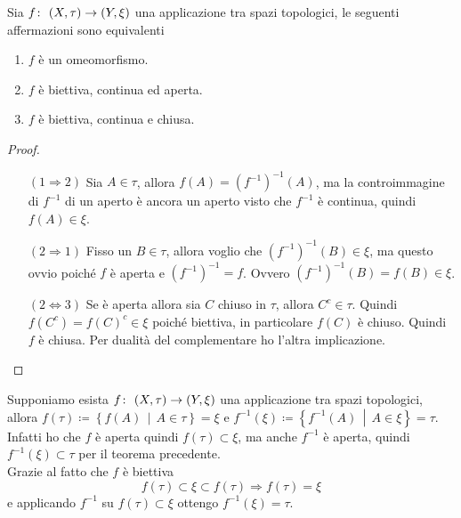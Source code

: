 \begin{theorem}
	Sia $f \colon\ (X,\tau) \rightarrow (Y,\xi)$ una applicazione tra spazi topologici, le seguenti affermazioni sono equivalenti
	\begin{enumerate}
		\item $f$ è un omeomorfismo.
		\item $f$ è biettiva, continua ed aperta.
		\item $f$ è biettiva, continua e chiusa.
	\end{enumerate}
\end{theorem}
\begin{proof} \
	\begin{enumerate}
		\item[$(1 \Rightarrow 2)$] Sia $A \in \tau$, allora $f(A) = (f^{-1})^{-1}(A)$, ma la controimmagine di $f^{-1}$ di un aperto è ancora un aperto visto che $f^{-1}$ è continua, quindi $f(A) \in \xi$.
		\item[$(2 \Rightarrow 1)$] Fisso un $B \in \tau$, allora voglio che $(f^{-1})^{-1}(B) \in \xi$, ma questo ovvio poiché $f$ è aperta e $(f^{-1})^{-1} = f$. Ovvero $(f^{-1})^{-1}(B) = f(B) \in \xi$.
		\item[$(2\Leftrightarrow 3)$] Se è aperta allora sia $C$ chiuso in $\tau$, allora $C^{c} \in \tau$. Quindi $f(C^c) = f(C)^c \in \xi$ poiché biettiva, in particolare $f(C)$ è chiuso. Quindi $f$ è chiusa. Per dualità del complementare ho l'altra implicazione.
	\end{enumerate}
\end{proof}

\begin{remark}
	Supponiamo esista $f \colon\ (X,\tau) \rightarrow (Y,\xi)$ una applicazione tra spazi topologici, allora $f(\tau) \coloneqq \left\{ f(A) \,\middle|\,  A \in \tau\right\} = \xi$ e $f^{-1}(\xi) \coloneqq \left\{ f^{-1}(A) \,\middle|\,  A \in \xi\right\} = \tau$. Infatti ho che $f$ è aperta quindi $f(\tau) \subset \xi$, ma anche $f^{-1}$ è aperta, quindi $f^{-1}(\xi) \subset \tau$ per il teorema precedente. \\ Grazie al fatto che $f$ è biettiva
	\begin{equation*}
		f(\tau) \subset \xi \subset f(\tau) \Longrightarrow f(\tau) = \xi
	\end{equation*} 
	e applicando $f^{-1}$ su $f(\tau) \subset \xi$ ottengo $f^{-1}(\xi) = \tau$.
\end{remark}

